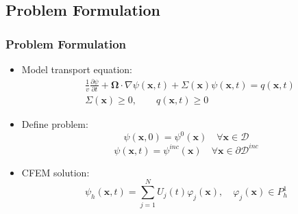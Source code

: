 \documentclass{beamer}
\newcommand{\pd}[2]{\frac{\partial #1}{\partial #2}}
\newcommand{\x}{\mathbf{x}}
\newcommand{\xt}{(\x,t)}
\begin{document}
\subsection{Problem Formulation}
\begin{frame}
\frametitle{Problem Formulation}

\begin{itemize}
   \item Model transport equation:
   \begin{align}\label{eq:tr}
      &\frac{1}{v}\pd{\psi}{t} + \mathbf{\Omega}\cdot\nabla \psi\xt
      + \Sigma(\x)\psi\xt = q\xt\\
      &\Sigma(\x)\ge 0,\qquad q\xt\ge 0\nonumber
   \end{align}
   \item Define problem:
   \begin{equation}
      \psi(\x,0) = \psi^0(\x) \quad \forall \x\in \mathcal{D}
   \end{equation}
   \begin{equation}
      \psi\xt = \psi^{inc}(\x) \quad \forall \x\in \partial \mathcal{D}^{inc}
   \end{equation}
   \item CFEM solution:
   \begin{equation}
      \psi_h\xt = \sum\limits_{j=1}^N U_j(t) \varphi_j(\x),
      \quad \varphi_j(\x)\in P^1_h
   \end{equation}
\end{itemize}

\end{frame}
\end{document}
